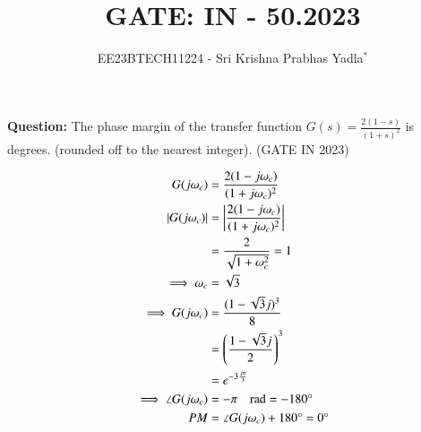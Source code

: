 \documentclass[journal,12pt,twocolumn]{IEEEtran}
\theoremstyle{remark}
\begin{document}

\vspace{3cm}

\title{GATE: IN - 50.2023}
\author{EE23BTECH11224 - Sri Krishna Prabhas Yadla$^{*}$%
}
\maketitle
\newpage
\bigskip

\renewcommand{\thefigure}{\arabic{figure}}
\renewcommand{\thetable}{\arabic{table}}


\vspace{3cm}
\textbf{Question:} The phase margin of the transfer function $G(s) = \frac{2(1-s)}{(1+s)^2}$ is \underline{\quad} degrees. (rounded off to the nearest integer). \hfill (GATE IN 2023)\\
\solution
\begin{table}[htbp]
	\centering
	\def\arraystrech{1.5}
	
	\caption{}
	\label{tab:parameters}
\end{table}
\begin{align}
	G(j\omega_c) &= \frac{2(1-j\omega_c)}{(1+j\omega_c)^2} \\
	\left\vert G(j\omega_c)\right\vert &= \left\vert\frac{2(1-j\omega_c)}{(1+j\omega_c)^2}\right\vert \\
	&= \frac{2}{\sqrt{1+\omega_c^2}} = 1 \\
	\implies \omega_c &= \sqrt{3} \\
	\implies G(j\omega_c) &= \frac{(1-\sqrt{3}j)^3}{8} \\
	&= \left(\frac{1-\sqrt{3}j}{2}\right)^3 \\
	&= e^{-3\frac{j\pi}{3}} \\
	\implies \angle G(j\omega_c)&= -\pi \quad \text{rad} = -180\degree \\
	PM &= \angle G(j\omega_c) + 180\degree = 0\degree
\end{align}
\end{document}
